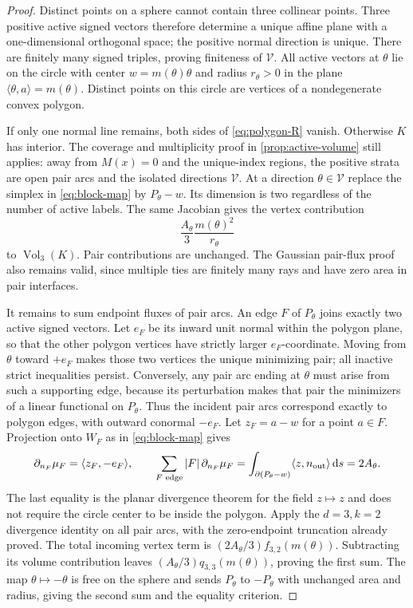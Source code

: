 \documentclass[10pt,reqno]{amsart}
\theoremstyle{definition}
\theoremstyle{remark}
\newcommand{\Vol}{\operatorname{Vol}}
\newcommand{\dd}{\,\mathrm d}
\newcommand{\ip}[2]{\langle #1,#2\rangle}
\begin{document}
\begin{proof}
Distinct points on a sphere cannot contain three collinear points. Three positive active signed vectors therefore determine a unique affine plane with a one-dimensional orthogonal space; the positive normal direction is unique. There are finitely many signed triples, proving finiteness of $\mathcal V$. All active vectors at $\theta$ lie on the circle with center $w=m(\theta)\theta$ and radius $r_\theta>0$ in the plane $\ip{\theta}{a}=m(\theta)$. Distinct points on this circle are vertices of a nondegenerate convex polygon.

If only one normal line remains, both sides of \eqref{eq:polygon-R} vanish. Otherwise $K$ has interior. The coverage and multiplicity proof in \cref{prop:active-volume} still applies: away from $M(x)=0$ and the unique-index regions, the positive strata are open pair arcs and the isolated directions $\mathcal V$. At a direction $\theta\in\mathcal V$ replace the simplex in \eqref{eq:block-map} by $P_\theta-w$. Its dimension is two regardless of the number of active labels. The same Jacobian gives the vertex contribution
\[
\frac{A_\theta}{3}\frac{m(\theta)^2}{r_\theta}
\]
 to $\Vol_3(K)$. Pair contributions are unchanged. The Gaussian pair-flux proof also remains valid, since multiple ties are finitely many rays and have zero area in pair interfaces.

It remains to sum endpoint fluxes of pair arcs. An edge $F$ of $P_\theta$ joins exactly two active signed vectors. Let $e_F$ be its inward unit normal within the polygon plane, so that the other polygon vertices have strictly larger $e_F$-coordinate. Moving from $\theta$ toward $+e_F$ makes those two vertices the unique minimizing pair; all inactive strict inequalities persist. Conversely, any pair arc ending at $\theta$ must arise from such a supporting edge, because its perturbation makes that pair the minimizers of a linear functional on $P_\theta$. Thus the incident pair arcs correspond exactly to polygon edges, with outward conormal $-e_F$.
Let $z_F=a-w$ for a point $a\in F$. Projection onto $W_F$ as in \eqref{eq:block-map} gives
\[
\partial_{n_F}\mu_F=\ip{z_F}{-e_F},\qquad
\sum_{F\text{ edge}}|F|\,\partial_{n_F}\mu_F
=\int_{\partial(P_\theta-w)}\ip{z}{n_{\rm out}}\dd s=2A_\theta.
\]
The last equality is the planar divergence theorem for the field $z\mapsto z$ and does not require the circle center to be inside the polygon. Apply the $d=3,k=2$ divergence identity on all pair arcs, with the zero-endpoint truncation already proved. The total incoming vertex term is $(2A_\theta/3)f_{3,2}(m(\theta))$. Subtracting its volume contribution leaves $(A_\theta/3)q_{3,3}(m(\theta))$, proving the first sum. The map $\theta\mapsto-\theta$ is free on the sphere and sends $P_\theta$ to $-P_\theta$ with unchanged area and radius, giving the second sum and the equality criterion.
\end{proof}
\end{document}
